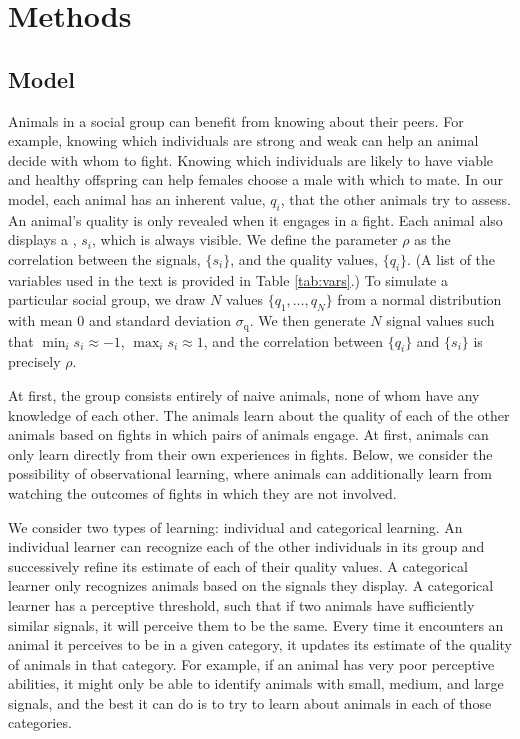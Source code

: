 \section*{Methods} 
%
\subsection*{Model}
%
Animals in a social group can benefit from knowing about their peers. For example, knowing which individuals are strong and weak can help an animal decide with whom to fight. Knowing which individuals are likely to have viable and healthy offspring can help females choose a male with which to mate. In our model, each animal has an inherent  value, $q_i$, that the other animals try to assess. An animal's quality is only revealed when it engages in a fight. Each animal also displays a , $s_i$, which is always visible. We define the parameter $\rho$ as the correlation between the signals, $\{s_i\}$, and the quality values, $\{q_i\}$. (A list of the variables used in the text is provided in Table \ref{tab:vars}.) To simulate a particular social group, we draw $N$ values $\{q_1,\dots,q_N\}$ from a normal distribution with mean $0$ and standard deviation $\sigma_\text{q}$. We then generate $N$ signal values such that $\min_i{s_i}\approx -1$, $\max_i{s_i}\approx 1$, and the correlation between $\{q_i\}$ and $\{s_i\}$ is precisely $\rho$.
  
At first, the group consists entirely of naive animals, none of whom have any knowledge of each other. The animals learn about the quality of each of the other animals based on fights in which pairs of animals engage. At first, animals can only learn directly from their own experiences in fights. Below, we consider the possibility of observational learning, where animals can additionally learn from watching the outcomes of fights in which they are not involved.  

We consider two types of learning: individual and categorical learning. An individual learner can recognize each of the other individuals in its group and successively refine its estimate of each of their quality values. A categorical learner only recognizes animals based on the signals they display. A categorical learner has a perceptive threshold, such that if two animals have sufficiently similar signals, it will perceive them to be the same. Every time it encounters an animal it perceives to be in a given category, it updates its estimate of the quality of animals in that category. For example, if an animal has very poor perceptive abilities, it might only be able to identify animals with small, medium, and large signals, and the best it can do is to try to learn about animals in each of those categories. 

